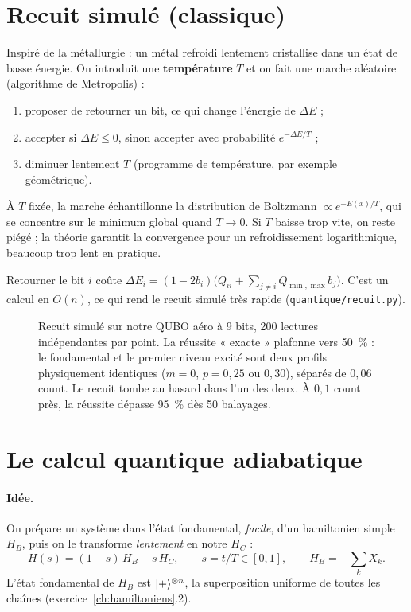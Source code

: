 \section{Recuit simulé (classique)}
Inspiré de la métallurgie : un métal refroidi lentement cristallise dans un état de basse énergie. On introduit une \textbf{température} $T$ et on fait une marche aléatoire (algorithme de Metropolis) :
\begin{enumerate}
\item proposer de retourner un bit, ce qui change l'énergie de $\Delta E$ ;
\item accepter si $\Delta E\le0$, sinon accepter avec probabilité $e^{-\Delta E/T}$ ;
\item diminuer lentement $T$ (programme de température, par exemple géométrique).
\end{enumerate}
À $T$ fixée, la marche échantillonne la distribution de Boltzmann $\propto e^{-E(x)/T}$, qui se concentre sur le minimum global quand $T\to0$. Si $T$ baisse trop vite, on reste piégé ; la théorie garantit la convergence pour un refroidissement logarithmique, beaucoup trop lent en pratique.

Retourner le bit $i$ coûte $\Delta E_i=(1-2b_i)\big(Q_{ii}+\sum_{j\neq i}Q_{\min,\max}b_j\big)$. C'est un calcul en $O(n)$, ce qui rend le recuit simulé très rapide (\texttt{quantique/recuit.py}).

\begin{figure}[htbp]
\centering

\caption{Recuit simulé sur notre QUBO aéro à 9 bits, 200 lectures indépendantes par point. La réussite « exacte » plafonne vers 50~\% : le fondamental et le premier niveau excité sont deux profils physiquement identiques ($m=0$, $p=0{,}25$ ou $0{,}30$), séparés de $0{,}06$ count. Le recuit tombe au hasard dans l'un des deux. À $0{,}1$ count près, la réussite dépasse 95~\% dès 50 balayages.}\label{fig:recuit}
\end{figure}

\section{Le calcul quantique adiabatique}
\paragraph{Idée.} On prépare un système dans l'état fondamental, \emph{facile}, d'un hamiltonien simple $H_B$, puis on le transforme \emph{lentement} en notre $H_C$ :
\[H(s)=(1-s)\,H_B+s\,H_C,\qquad s=t/T\in[0,1],\qquad H_B=-\sum_kX_k .\]
L'état fondamental de $H_B$ est $\lvert +\rangle^{\otimes n}$, la superposition uniforme de toutes les chaînes (exercice~\ref{ch:hamiltoniens}.2).

